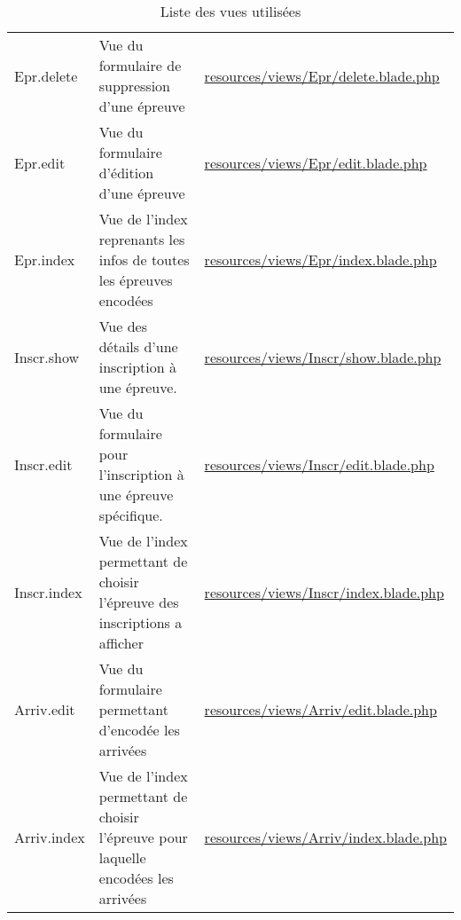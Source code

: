 \begin{table}[H]
\begin{adjustbox}{width=\textwidth}
\begin{tabular}{|l|p{}|p{}|}
			Epr.delete 		& Vue du formulaire de suppression d'une épreuve 										 & \url{resources/views/Epr/delete.blade.php} \\
			Epr.edit 		& Vue du formulaire d'édition d'une épreuve 											 & \url{resources/views/Epr/edit.blade.php} \\
			Epr.index 		& Vue de l'index reprenants les infos de toutes les épreuves encodées 				 & \url{resources/views/Epr/index.blade.php} \\
			Inscr.show 		& Vue des détails d'une inscription à une épreuve. 									 & \url{resources/views/Inscr/show.blade.php} \\
			Inscr.edit 		& Vue du formulaire pour l'inscription à une épreuve spécifique. 						 & \url{resources/views/Inscr/edit.blade.php} \\
			Inscr.index 	& Vue de l'index permettant de choisir l'épreuve des inscriptions a afficher 			 & \url{resources/views/Inscr/index.blade.php} \\
			Arriv.edit 		& Vue du formulaire permettant d'encodée les arrivées 								 & \url{resources/views/Arriv/edit.blade.php} \\
			Arriv.index 	& Vue de l'index permettant de choisir l'épreuve pour laquelle encodées les arrivées 	 & \url{resources/views/Arriv/index.blade.php} \\
			\hline
		\end{tabular}
	\end{adjustbox}
	\caption{Liste des vues utilisées}
\end{table}